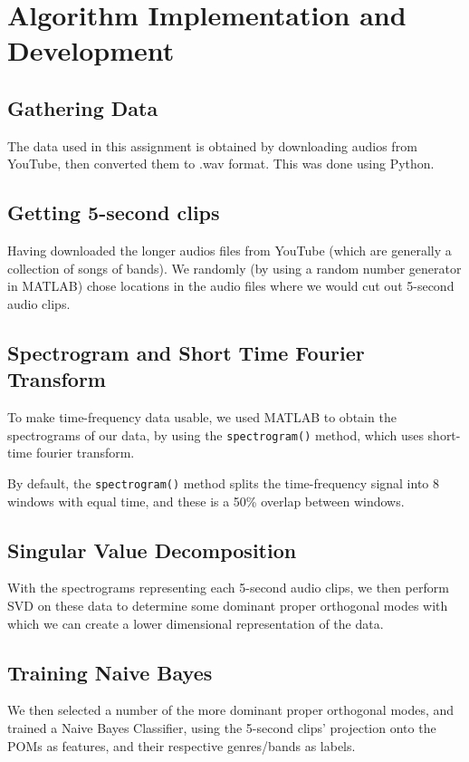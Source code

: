 \documentclass[12pt, a4paper]{article}
\begin{document}
\section{Algorithm Implementation and Development}
\subsection{Gathering Data}
The data used in this assignment is obtained by downloading audios from YouTube, then converted them to .wav format. This was done using Python.

\subsection{Getting 5-second clips}
Having downloaded the longer audios files from YouTube (which are generally a collection of songs of bands). We randomly (by using a random number generator in MATLAB) chose locations in the audio files where we would cut out 5-second audio clips.

\subsection{Spectrogram and Short Time Fourier Transform}
To make time-frequency data usable, we used MATLAB to obtain the spectrograms of our data, by using the \texttt{spectrogram()} method, which uses short-time fourier transform.

By default, the \texttt{spectrogram()} method splits the time-frequency signal into 8 windows with equal time, and these is a 50\% overlap between windows.

\subsection{Singular Value Decomposition}
With the spectrograms representing each 5-second audio clips, we then perform SVD on these data to determine some dominant proper orthogonal modes with which we can create a lower dimensional representation of the data.

\subsection{Training Naive Bayes}
We then selected a number of the more dominant proper orthogonal modes, and trained a Naive Bayes Classifier, using the 5-second clips' projection onto the POMs as features, and their respective genres/bands as labels.
\end{document}
